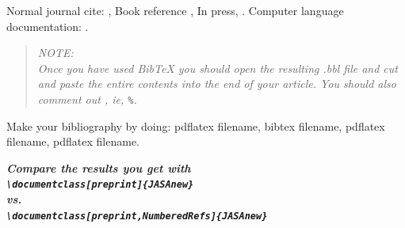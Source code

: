 \documentclass[reprint,NumberedRefs]{JASAnew}
\begin{document}
Normal journal cite: \citep{joursamp1},
 Book reference \citep{booksamp1},
In press, \citep{inpress3}. 
Computer language documentation:
\citep{sampcode2}.


\begin{quote}
\it
NOTE:\\
Once you have used BibTeX you
should open the resulting .bbl file and cut and paste the entire contents 
into the end of your article. You should also comment out
\verb++, ie,
\verb+%+.
\end{quote}

Make your bibliography by doing: pdflatex filename,  bibtex filename,
pdflatex filename, pdflatex filename.

{\bfseries\itshape
Compare the results you get with\\
{\verb+\documentclass[preprint]{JASAnew}+ }\\
vs.\\
{\verb+\documentclass[preprint,NumberedRefs]{JASAnew}+ }
}


\end{document}
